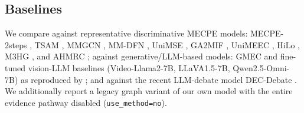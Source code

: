 \documentclass[journal]{IEEEtran}
\begin{document}
\subsection{Baselines}
We compare against representative discriminative MECPE models: MECPE-2steps
\cite{wang2023mecpe}, TSAM \cite{zhang2024tsam}, MMGCN \cite{hu2021mmgcn}, MM-DFN
\cite{hu2022mmdfn}, UniMSE \cite{hu2022unimse}, GA2MIF \cite{li2023ga2mif}, UniMEEC
\cite{jin2024unimeec}, HiLo \cite{li2024hilo}, M3HG \cite{zhang2024m3hg}, and AHMRC
\cite{li2024ahmrc}; against generative/LLM-based models: GMEC \cite{ju2025gmec} and
fine-tuned vision-LLM baselines (Video-Llama2-7B, LLaVA1.5-7B, Qwen2.5-Omni-7B) as reproduced
by \cite{wu2025decdebate}; and against the recent LLM-debate model DEC-Debate
\cite{wu2025decdebate}. We additionally report a legacy graph variant of our own model with
the entire evidence pathway disabled (\texttt{use\_method=no}).
\end{document}
